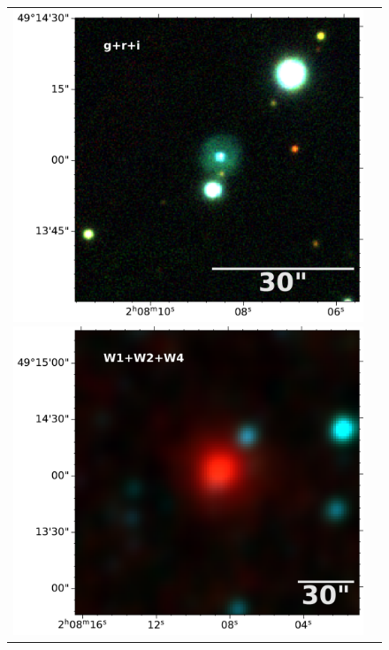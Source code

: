 \documentclass{article}
\begin{document}
\begin{figure}
  \centering
  \begin{tabular}{l l}
\includegraphics[width=0.5\linewidth]{../image-panstarr/cutout_rings_v3_skycell_2294_031_stk_i_unconv-irg-RGB.pdf}
\includegraphics[width=0.5\linewidth]{../image-wise/w4_ra32_035994_dec49_233615-421-RGB.pdf}
\end{tabular}  
  \caption{} 
  \label{fig:image}
\end{figure}


\end{document}
